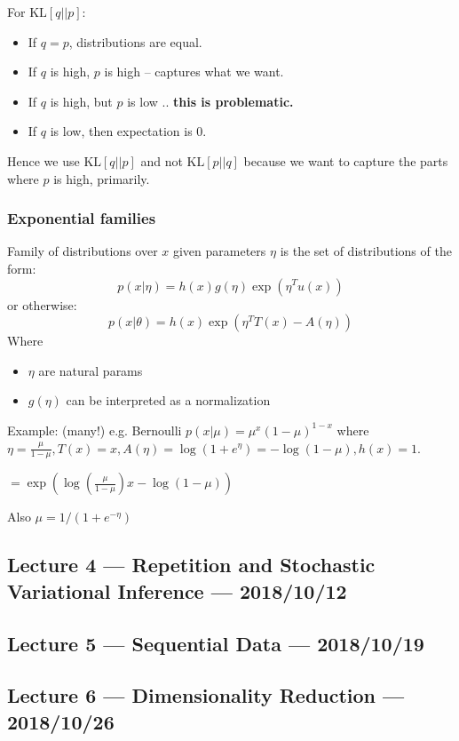 \documentclass{article}
\newcommand{\KL}[2]{\mathrm{KL}\left[#1||#2\right]}
\begin{document}
For $\KL{q}{p}$:
\begin{itemize}
    \item If $q = p$, distributions are equal.
    \item If $q$ is high, $p$ is high -- captures what we want.
    \item If $q$ is high, but $p$ is low .. \textbf{this is problematic.}
    \item If $q$ is low, then expectation is 0.
\end{itemize}

Hence we use $\KL{q}{p}$ and not $\KL{p}{q}$ because we want to capture the parts where $p$ is high, primarily.

\subsubsection{Exponential families}

Family of distributions over $x$ given parameters $\eta$ is the set of distributions of the form:
$$p(x|\eta) = h(x)g(\eta)\exp(\eta^Tu(x))$$
or otherwise:
$$p(x|\theta) = h(x) \exp(\eta^T T(x) - A(\eta))$$
Where
\begin{itemize}
    \item $\eta$ are natural params
    \item $g(\eta)$ can be interpreted as a normalization
\end{itemize}

Example: (many!) e.g. Bernoulli $p(x|\mu) = \mu^x (1-\mu)^{1-x}$ 
where $\eta = \frac{\mu}{1-\mu}, T(x) = x, A(\eta) = \log(1+e^\eta) = -\log(1-\mu), h(x) = 1$.

$= \exp\left(\log\left(\frac{\mu}{1-\mu}\right)x - \log(1-\mu)\right)$

Also $\mu = 1 / (1+e^{-\eta})$



\subsection{Lecture 4 --- Repetition and Stochastic Variational Inference --- 2018/10/12}

\subsection{Lecture 5 --- Sequential Data --- 2018/10/19}

\subsection{Lecture 6 --- Dimensionality Reduction --- 2018/10/26}
\end{document}
